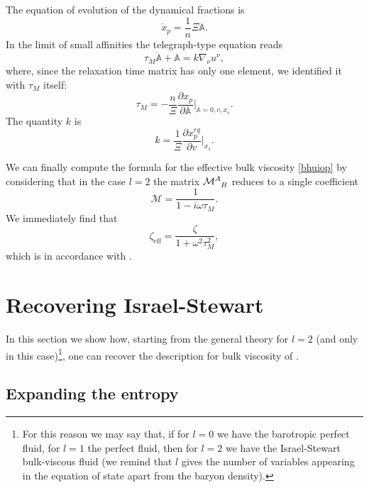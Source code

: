 \documentclass[useAMS,usenatbib,prd,twocolumn,nofootinbib]{revtex4-1}
\begin{document}
The equation of evolution of the dynamical fractions is
\begin{equation}\label{vnguir}
\dot{x}_p =\dfrac{1}{n} \Xi \mathbb{A}.
\end{equation}
In the limit of small affinities the telegraph-type equation reads
\begin{equation}
\tau_M \dot{\mathbb{A}} + \mathbb{A} = k \nabla_\nu u^\nu ,
\end{equation}
where, since the relaxation time matrix has only one element, we identified it with $\tau_M$ itself:
\begin{equation}\label{tauMMMMMMMMMMMMMMMMMMMMMM}
\tau_M = -\dfrac{n}{\Xi} \dfrac{\partial x_p}{\partial \mathbb{A}} \bigg|_{\mathbb{A}=0,v,x_s} .
\end{equation}
The quantity $k$ is
\begin{equation}
k = \dfrac{1}{\Xi} \dfrac{\partial x_p^{eq}}{\partial v} \bigg|_{x_s} .
\end{equation}

We can finally compute the formula for the effective bulk viscosity \eqref{bhuiop} by considering that in the case $l=2$ the matrix $\mathcal{M}\indices{^A _B}$ reduces to a single coefficient
\begin{equation}
\mathcal{M} = \dfrac{1}{1-i\omega \tau_M} .
\end{equation}
We immediately find that
\begin{equation}\label{sawyerrr}
\zeta_{\textrm{eff}} = \dfrac{\zeta}{1 + \omega^2 \tau_M^2} ,
\end{equation}
which is in accordance with \citet{Sawyer_Bulk1989}.

 
\section{Recovering Israel-Stewart}\label{recovering IS}

In this section we show how, starting from the general theory for $l=2$ (and only in this case)\footnote{
    For this reason we may say that, if for $l=0$ we have the barotropic perfect fluid, for $l=1$ the perfect fluid, then for $l=2$ we have the Israel-Stewart bulk-viscous fluid (we remind that $l$ gives the number of variables appearing in the equation of state apart from the baryon density).
}, one can recover the description for bulk viscosity of \citet{Israel_Stewart_1979}.

\subsection{Expanding the entropy}
\end{document}
